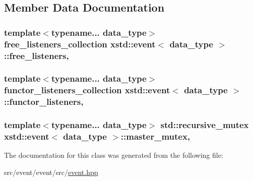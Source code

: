 \subsection{Member Data Documentation}
\hypertarget{classxstd_1_1event_a045873dfdf4fe07af8421d81592d3275}{
\subsubsection[{free\-\_\-listeners}]{\setlength{\rightskip}{0pt plus 5cm}template$<$typename... data\-\_\-type$>$ free\-\_\-listeners\-\_\-collection {\bf xstd\-::event}$<$ data\-\_\-type $>$\-::free\-\_\-listeners\hspace{0.3cm}{\ttfamily [mutable]}, {\ttfamily [protected]}}}\label{classxstd_1_1event_a045873dfdf4fe07af8421d81592d3275}
\hypertarget{classxstd_1_1event_a3e4c0ca4abd96a0af619cdb96e3cfef2}{
\subsubsection[{functor\-\_\-listeners}]{\setlength{\rightskip}{0pt plus 5cm}template$<$typename... data\-\_\-type$>$ functor\-\_\-listeners\-\_\-collection {\bf xstd\-::event}$<$ data\-\_\-type $>$\-::functor\-\_\-listeners\hspace{0.3cm}{\ttfamily [mutable]}, {\ttfamily [protected]}}}\label{classxstd_1_1event_a3e4c0ca4abd96a0af619cdb96e3cfef2}
\hypertarget{classxstd_1_1event_afaaee3e44989122c9e1db6f4d1547de8}{
\subsubsection[{master\-\_\-mutex}]{\setlength{\rightskip}{0pt plus 5cm}template$<$typename... data\-\_\-type$>$ std\-::recursive\-\_\-mutex {\bf xstd\-::event}$<$ data\-\_\-type $>$\-::master\-\_\-mutex\hspace{0.3cm}{\ttfamily [mutable]}, {\ttfamily [protected]}}}\label{classxstd_1_1event_afaaee3e44989122c9e1db6f4d1547de8}


The documentation for this class was generated from the following file\-:\begin{DoxyCompactItemize}
\item 
src/event/event/src/\hyperlink{event_8hpp}{event.\-hpp}\end{DoxyCompactItemize}

